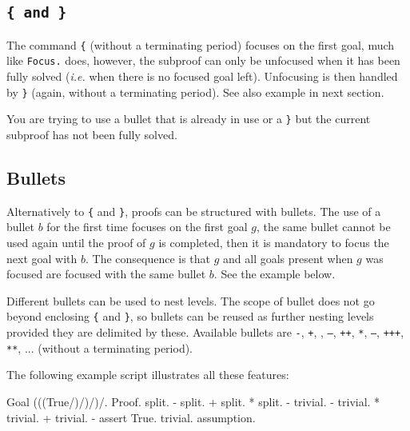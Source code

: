 \subsection[\tt \{ \textrm{and} \}]{\tt \{ \textrm{and} \}\comindex{\{}\comindex{\}}}
The command {\tt \{} (without a terminating period) focuses on the
first goal, much like {\tt Focus.} does, however, the subproof can
only be unfocused when it has been fully solved (\emph{i.e.} when
there is no focused goal left). Unfocusing is then handled by {\tt \}}
(again, without a terminating period). See also example in next section.

\begin{ErrMsgs}
\item {}
  You are trying to use a bullet that is already in use or a {\tt \}} but the current
  subproof has not been fully solved.
\end{ErrMsgs}

\subsection[Bullets]{Bullets}
Alternatively to {\tt \{} and {\tt \}}, proofs can be structured with
bullets. The use of a bullet $b$ for the first time focuses on the
first goal $g$, the same bullet cannot be used again until the proof
of $g$ is completed, then it is mandatory to focus the next goal with $b$. The
consequence is that $g$ and all goals present when $g$ was focused are
focused with the same bullet $b$. See the example below.

Different bullets can be used to nest levels. The scope of bullet does
not go beyond enclosing {\tt \{} and {\tt \}}, so bullets can be
reused as further nesting levels provided they are delimited by these.
Available bullets are {\tt -}, {\tt +}, {\tt *}, {\tt --}, {\tt ++}, {\tt **},
{\tt ---}, {\tt +++}, {\tt ***}, ... (without a
terminating period).

The following example script illustrates all these features:
\begin{coq_example*}
Goal (((True/\True)/\True)/\True)/\True.
Proof.
  split.
  - split.
    + split.
      * { split.
          - trivial.
          - trivial.
        }
      * trivial.
    + trivial.
  - assert True.
    { trivial. }
    assumption.
\end{coq_example*}

